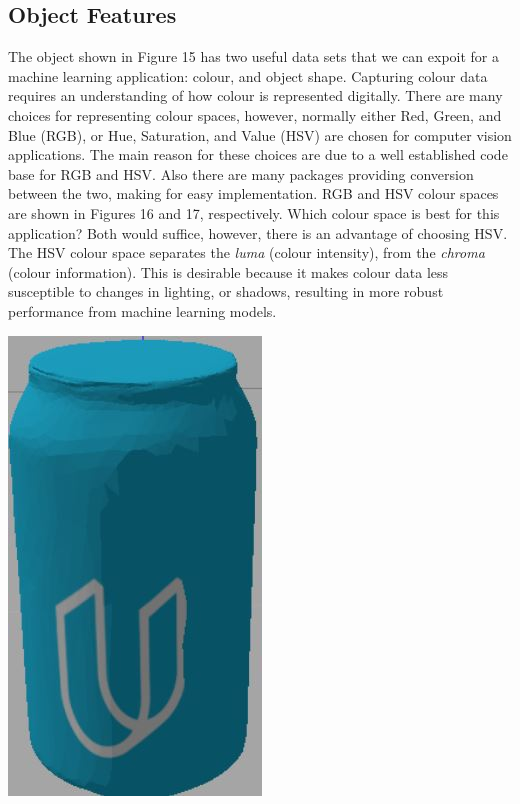 \documentclass[a4paper]{article}
\begin{document}
\subsection{Object Features}
\begin{minipage}{0.66\textwidth}
The object shown in Figure 15 has two useful data sets that we can expoit for a machine learning application: colour, and object shape. Capturing colour data requires an understanding of how colour is represented digitally. There are many choices for representing colour spaces, however, normally either Red, Green, and Blue (RGB), or Hue, Saturation, and Value (HSV) are chosen for computer vision applications. The main reason for these choices are due to a well established code base for RGB and HSV. Also there are many packages providing conversion between the two, making for easy implementation. RGB and HSV colour spaces are shown in Figures 16 and 17, respectively. Which colour space is best for this application? Both would suffice, however, there is an advantage of choosing HSV. The HSV colour space separates the \textit{luma} (colour intensity), from the \textit{chroma} (colour information). This is desirable because it makes colour data less susceptible to changes in lighting, or shadows, resulting in more robust performance from machine learning models.
\end{minipage}
\hspace{0.5cm}
\begin{minipage}{0.33\textwidth}
		\centering
		\includegraphics[scale=0.5]{can_image}
\end{minipage}
	
\end{document}
